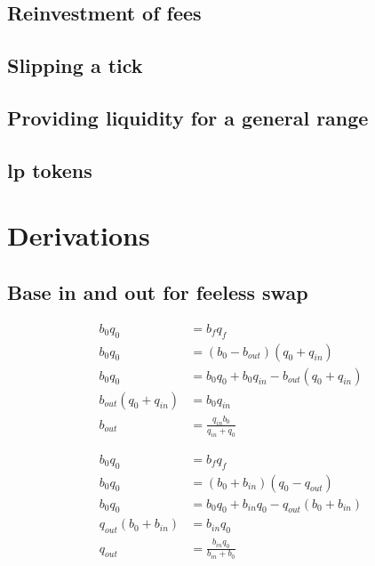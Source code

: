\documentclass[table, twocolumn]{article}
\begin{document}
\subsection{Reinvestment of fees}

\subsection{Slipping a tick}

\subsection{Providing liquidity for a general range}

\subsection{\gls{lp} tokens}

\section{Derivations}

\subsection{Base in and out for feeless swap} \label{eqn:b-q-out-simple-derivation}

\begin{align}
  b_0 q_0               & = b_f q_f \nonumber                                      \\
  b_0 q_0               & = (b_0 - b_{out})(q_0 + q_{in}) \nonumber                \\
  b_0 q_0               & = b_0 q_0 + b_0 q_{in} - b_{out}(q_0 + q_{in}) \nonumber \\
  b_{out}(q_0 + q_{in}) & = b_{0} q_{in} \nonumber                                 \\
  b_{out}               & = \frac{q_{in} b_0}{q_{in} + q_0}
\end{align}

\begin{align}
  b_0 q_0               & = b_f q_f \nonumber                                      \\
  b_0 q_0               & = (b_0 + b_{in})(q_0 - q_{out}) \nonumber                \\
  b_0 q_0               & = b_0 q_0 + b_{in} q_0 - q_{out}(b_0 + b_{in}) \nonumber \\
  q_{out}(b_0 + b_{in}) & = b_{in} q_0 \nonumber                                   \\
  q_{out}               & = \frac{b_{in} q_0}{b_{in} + b_0}
\end{align}
\end{document}
